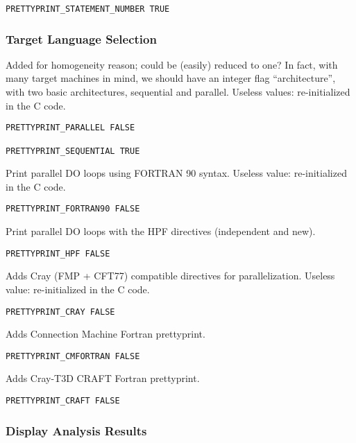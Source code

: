 \begin{verbatim}
PRETTYPRINT_STATEMENT_NUMBER TRUE 
\end{verbatim}

\subsubsection{Target Language Selection}

Added for homogeneity reason; could be (easily) reduced to one?  In
fact, with many target machines in mind, we should have an integer flag
``architecture'', with two basic architectures, sequential and parallel.
Useless values: re-initialized in the C code.

\begin{verbatim}
PRETTYPRINT_PARALLEL FALSE

PRETTYPRINT_SEQUENTIAL TRUE
\end{verbatim}

Print parallel DO loops using FORTRAN 90 syntax. Useless value:
re-initialized in the C code.

\begin{verbatim}
PRETTYPRINT_FORTRAN90 FALSE
\end{verbatim}

Print parallel DO loops with the HPF directives (independent and new).
\begin{verbatim}
PRETTYPRINT_HPF FALSE
\end{verbatim}

Adds Cray (FMP + CFT77) compatible directives for parallelization.
Useless value: re-initialized in the C code.

\begin{verbatim}
PRETTYPRINT_CRAY FALSE
\end{verbatim}

Adds Connection Machine Fortran prettyprint.

\begin{verbatim}
PRETTYPRINT_CMFORTRAN FALSE
\end{verbatim}

Adds Cray-T3D CRAFT Fortran prettyprint.

\begin{verbatim}
PRETTYPRINT_CRAFT FALSE
\end{verbatim}

\subsubsection{Display Analysis Results}

